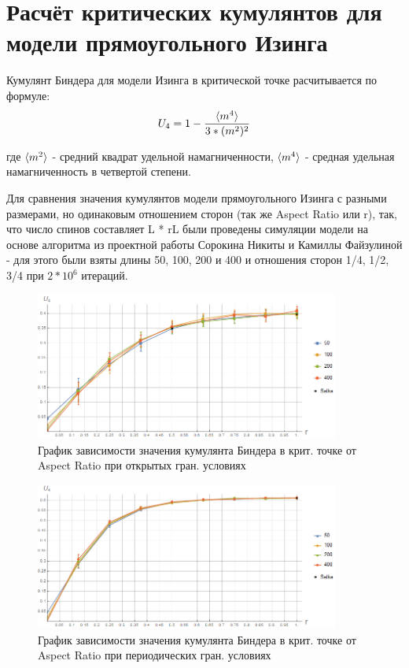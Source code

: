 \section{Расчёт критических кумулянтов для модели прямоугольного Изинга}

Кумулянт Биндера для модели Изинга в критической точке расчитывается по формуле:
\begin{equation}
\label{eq:Cumulant}
U_{4} = 1 - \frac{\langle m^{4} \rangle}{3 * (m^{2})^{2}}
\end{equation}

где $\langle m^{2} \rangle$ - средний квадрат удельной намагниченности, $\langle m^{4} \rangle$ - средная удельная намагниченность в четвертой степени. 

Для сравнения значения кумулянтов модели прямоугольного Изинга с разными размерами, но одинаковым отношением сторон (так же Aspect Ratio или r), так, что число спинов составляет L * rL были проведены симуляции модели на основе алгоритма из проектной работы Сорокина Никиты \cite{Schro} и Камиллы Файзулиной \cite{SAW} - для этого были взяты длины 50, 100, 200 и 400 и отношения сторон 1/4, 1/2, 3/4 при $2 * 10^{6}$ итераций.

\begin{figure}[!h]
    \centering
    \includegraphics[width=100mm]{Sections/Images/CumulantOBC.png}
    \caption{График зависимости значения кумулянта Биндера в крит. точке от Aspect Ratio при открытых гран. условиях}
    \label{fig:CumulOBC}
\end{figure}

\begin{figure}[!h]
    \centering
    \includegraphics[width=100mm]{Sections/Images/CumulantPBC.png}
    \caption{График зависимости значения кумулянта Биндера в крит. точке от Aspect Ratio при периодических гран. условиях}
    \label{fig:CumulPBC}
\end{figure}

